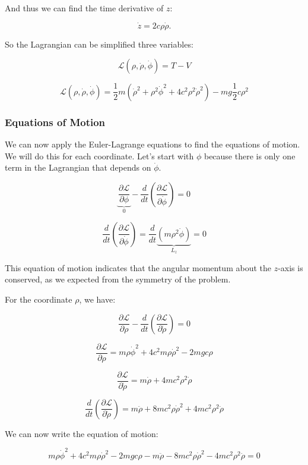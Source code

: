 \documentclass[11pt]{article}
\begin{document}
And thus we can find the time derivative of \(z\):

\[\dot{z} = 2c\rho\dot{\rho}.\]

So the Lagrangian can be simplified three variables:

\[\mathcal{L}(\rho, \dot{\rho}, \dot{\phi}) = T - V\]

\[\mathcal{L}(\rho, \dot{\rho}, \dot{\phi}) = \dfrac{1}{2}m\left(\dot{\rho}^2 + \rho^2\dot{\phi}^2 + 4c^2\rho^2\dot{\rho}^2\right) - mg\dfrac{1}{2}c\rho^2\]

\subsubsection{Equations of Motion}\label{equations-of-motion}

We can now apply the Euler-Lagrange equations to find the equations of
motion. We will do this for each coordinate. Let's start with \(\phi\)
because there is only one term in the Lagrangian that depends on
\(\dot{\phi}\).

\[\underbrace{\dfrac{\partial \mathcal{L}}{\partial \phi}}_0 - \dfrac{d}{dt}\left(\dfrac{\partial \mathcal{L}}{\partial \dot{\phi}}\right) = 0\]

\[\dfrac{d}{dt}\left(\dfrac{\partial \mathcal{L}}{\partial \dot{\phi}}\right) = \dfrac{d}{dt}\underbrace{\left(m\rho^2\dot{\phi}\right)}_{L_z} = 0\]

This equation of motion indicates that the angular momentum about the
\(z\)-axis is conserved, as we expected from the symmetry of the
problem.

For the coordinate \(\rho\), we have:

\[\dfrac{\partial \mathcal{L}}{\partial \rho} - \dfrac{d}{dt}\left(\dfrac{\partial \mathcal{L}}{\partial \dot{\rho}}\right) = 0\]

\[\dfrac{\partial \mathcal{L}}{\partial \rho} = m\rho\dot{\phi}^2 + 4c^2m\rho\dot{\rho}^2 - 2mgc\rho\]

\[\dfrac{\partial \mathcal{L}}{\partial \dot{\rho}} = m\dot{\rho} + 4mc^2\rho^2\dot{\rho}\]

\[\dfrac{d}{dt}\left(\dfrac{\partial \mathcal{L}}{\partial \dot{\rho}}\right) = m\ddot{\rho} + 8mc^2\rho\dot{\rho}^2 + 4mc^2\rho^2\ddot{\rho}\]

We can now write the equation of motion:

\[m\rho\dot{\phi}^2 + 4c^2m\rho\dot{\rho}^2 - 2mgc\rho - m\ddot{\rho} - 8mc^2\rho\dot{\rho}^2 - 4mc^2\rho^2\ddot{\rho} = 0\]
\end{document}
